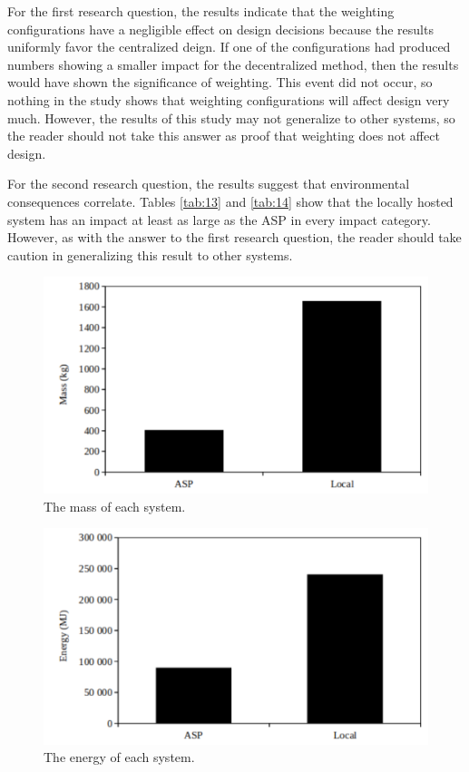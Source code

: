 \documentclass[final,journal,10pt,letterpaper,oneside,twocolumn,compsoc]%
{IEEEtran}
\begin{document}
For the first research question, the results indicate that the weighting
configurations have a negligible effect on design decisions because the results
uniformly favor the centralized deign. If one of the configurations had produced
numbers showing a smaller impact for the decentralized method, then the results
would have shown the significance of weighting. This event did not occur, so
nothing in the study shows that weighting configurations will affect design very
much. However, the results of this study may not generalize to other systems, so
the reader should not take this answer as proof that weighting does not affect
design.

For the second research question, the results suggest that environmental
consequences
correlate. Tables \ref{tab:13} and \ref{tab:14} show that the locally hosted
system has
an impact at least as large as the ASP in every impact category. However, as
with the answer to the first research question, the
reader should take caution in generalizing this result to other systems.

\begin{figure}[t!]
  \centering
    \includegraphics[scale=0.55]{mass}
  \caption{The mass of each system.}
  \label{fig:tab3}
\end{figure}
\begin{figure}[t]
  \centering
    \includegraphics[scale=0.55]{energy}
  \caption{The energy of each system.}
  \label{fig:tab4}
\end{figure}
\end{document}
